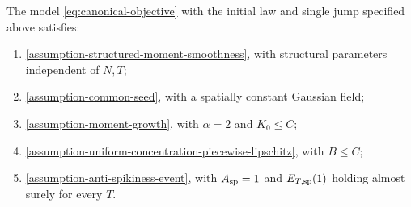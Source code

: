 \begin{lemma}
\label{lem:canonical-comparison-assumptions}
The model \eqref{eq:canonical-objective} with the initial law and
single jump specified above satisfies:
\begin{enumerate}[label=(\roman*),leftmargin=*]
 \item \cref{assumption-structured-moment-smoothness}, with structural
 parameters independent of $N,T$;
 \item \cref{assumption-common-seed}, with a spatially constant Gaussian field;
 \item \cref{assumption-moment-growth}, with $\alpha=2$ and $K_0\le C$;
 \item \cref{assumption-uniform-concentration-piecewise-lipschitz}, with $B\le C$;
 \item \cref{assumption-anti-spikiness-event}, with $A_{\rm sp}=1$ and
 $E_{T,\rm sp}(1)$ holding almost surely for every $T$.
\end{enumerate}
\end{lemma}
